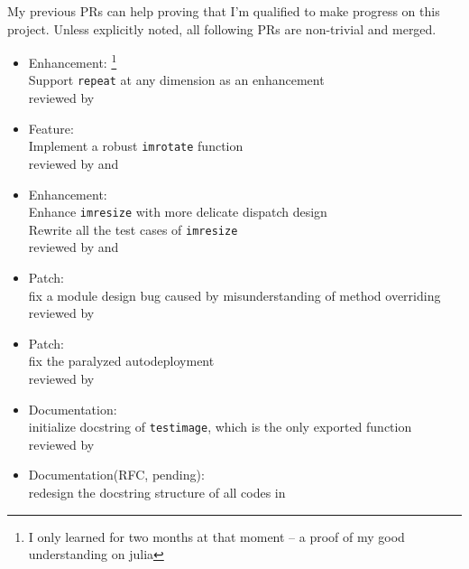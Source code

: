 My previous PRs can help proving that I'm qualified to make progress on this project. Unless explicitly noted, all following PRs are non-trivial and merged.
\begin{itemize}
    \item Enhancement: \footnote{I only learned \langjulia{} for two months at that moment -- a proof of my good understanding on julia}\\
      {\small
      Support \texttt{repeat} at any dimension as an enhancement\\
      reviewed by \mbauman
      }
    \item Feature: \\
      {\small
      Implement a robust \texttt{imrotate} function\\
      reviewed by \evizero and \timholy
      }
    \item Enhancement: \\
      {\small
      Enhance \texttt{imresize} with more delicate dispatch design\\
      Rewrite all the test cases of \texttt{imresize}\\
      reviewed by \evizero and \timholy
      }
    \item Patch: \\
      {\small
      fix a module design bug caused by misunderstanding of method overriding\\
      reviewed by \julio
      }
    \item Patch:  \\
      {\small
      fix the paralyzed autodeployment \\
      reviewed by \evizero
      }
    \item Documentation: \\
      {\small
      initialize docstring of \texttt{testimage}, which is the only exported function\\
      reviewed by \timholy
      }
    \item Documentation(RFC, pending): \\
      {\small
      redesign the docstring structure of all codes in \imagebinarization\\
}
\end{itemize}
